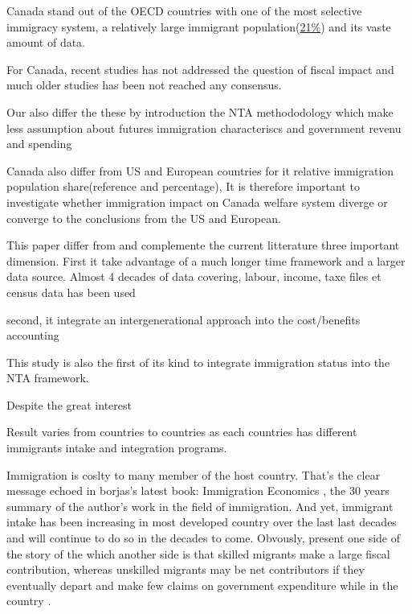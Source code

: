  Canada stand out of the OECD countries with one of the most selective immigracy system, a relatively large immigrant population(\hyperref[note:immig]{21\%\footnotemark}) and its vaste amount of data.


  For Canada, recent studies has not addressed the question of fiscal impact and much older studies has been not reached any consensus.



  Our also differ the these by introduction the NTA methododology which make less assumption about futures immigration characteriscs and government revenu and spending






  Canada also differ from US and European countries for it relative immigration population share(reference and percentage), It is therefore important to investigate whether immigration impact on Canada welfare system diverge or converge to the conclusions from the US and European.


  This paper differ from and complemente the current litterature three important dimension.
  First it take advantage of a much longer time framework and a larger data source. Almost 4 decades of data covering, labour, income, taxe files et census data has been used

  second, it integrate an intergenerational approach into the cost/benefits accounting



  This study is also the first of its kind to integrate immigration status into the NTA framework.

  Despite the great interest

  Result varies from countries to countries as each countries has different immigrants intake and integration programs.

  Immigration is coslty to many member of the host country. That's the clear message echoed in borjas's latest book: Immigration Economics \citep{Card:2016ku}, the 30 years summary of the author's work in the field of immigration. And yet, immigrant intake has been increasing in most developed country over the last last decades and will continue to do so in the decades to come. Obvously,  \citep{Borjas:2014hr} present one side of the story of the which another side is that skilled migrants make a large fiscal contribution, whereas unskilled migrants may be net contributors if they eventually depart and make few claims on government expenditure while in the country \citep{Rowthorn:2008kk}.

